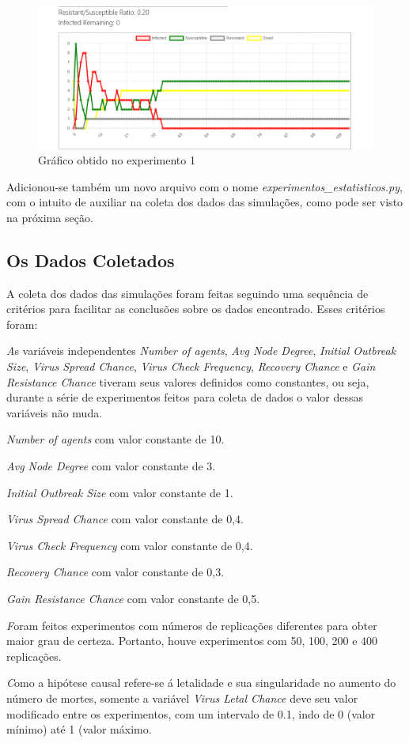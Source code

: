 \begin{figure}[H]
    \centering
    \includegraphics[angle=0,width=1\textwidth]{exploratory-data-analysis/seraphritt/PesqBibliogr/Virus-Network/grafico_compexp.png}
    \caption{Gráfico obtido no experimento 1}
    \label{fig:seraphritt:Graf}
\end{figure}

Adicionou-se também um novo arquivo com o nome \textit{experimentos\_estatisticos.py}, com o intuito de auxiliar na coleta dos dados das simulações, como pode ser visto na próxima seção.
\subsection{Os Dados Coletados}

A coleta dos dados das simulações foram feitas seguindo uma sequência de critérios para facilitar as conclusões sobre os dados encontrado. Esses critérios foram:
 \begin{description}
\item\textit As variáveis independentes \textit{Number of agents}, \textit{Avg Node Degree}, \textit{Initial Outbreak Size}, \textit{Virus Spread Chance}, \textit{Virus Check Frequency}, \textit{Recovery Chance} e \textit{Gain Resistance Chance}
tiveram seus valores definidos como constantes, ou seja, durante a série de experimentos feitos para coleta de dados  o valor dessas variáveis não muda.
\item  \textit{Number of agents} com valor constante de 10.
\item  \textit{Avg Node Degree} com valor constante de 3.
\item \textit{Initial Outbreak Size} com valor constante de 1.
\item  \textit{Virus Spread Chance} com valor constante de 0,4.
\item \textit{Virus Check Frequency} com valor constante de 0,4.
\item  \textit{Recovery Chance} com valor constante de 0,3.
\item \textit{Gain Resistance Chance} com valor constante de 0,5.
\item \textit Foram feitos experimentos com números de replicações diferentes para obter maior grau de certeza. Portanto, houve experimentos com 50, 100, 200 e 400 replicações.
\item \textit Como a hipótese causal refere-se á letalidade e sua singularidade no aumento do número de mortes, somente a variável \textit{Virus Letal Chance} deve seu valor modificado entre os experimentos, com um intervalo de 0.1, indo de 0 (valor mínimo) até 1 (valor máximo.
\end{description}


